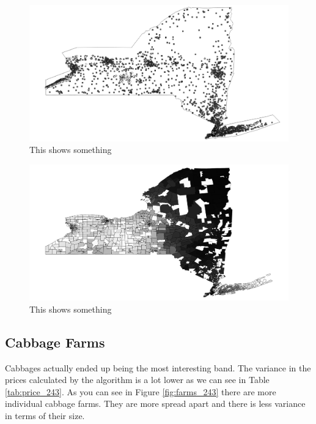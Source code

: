 \documentclass{report}
\begin{document}
\begin{figure}
\centering
\begin{framed}
\includegraphics[scale=.4]{network_69}
\caption{This shows something}
\end{framed}
\end{figure}

\begin{figure}
\centering
\begin{framed}
\includegraphics[scale=.4]{prices_69}
\caption{This shows something}
\end{framed}
\end{figure}

\subsection{Cabbage Farms}

Cabbages actually ended up being the most interesting band. The variance in the prices calculated by the algorithm is a lot lower as we can see in Table \ref{tab:price_243}. As you can see in Figure \ref{fig:farms_243} there are more individual cabbage farms. They are more spread apart and there is less variance in terms of their size.
\end{document}
